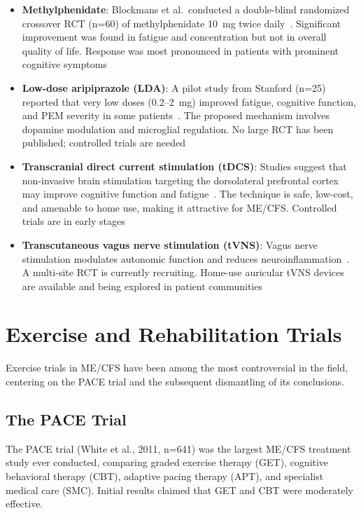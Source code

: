 \begin{itemize}
    \item \textbf{Methylphenidate}: Blockmans et al.\ conducted a double-blind randomized crossover RCT (n=60) of methylphenidate 10~mg twice daily~\cite{Blockmans2006methylphenidate}. Significant improvement was found in fatigue and concentration but not in overall quality of life. Response was most pronounced in patients with prominent cognitive symptoms
    \item \textbf{Low-dose aripiprazole (LDA)}: A pilot study from Stanford (n=25) reported that very low doses (0.2--2~mg) improved fatigue, cognitive function, and PEM severity in some patients~\cite{Crosby2021LDA}. The proposed mechanism involves dopamine modulation and microglial regulation. No large RCT has been published; controlled trials are needed
    \item \textbf{Transcranial direct current stimulation (tDCS)}: Studies suggest that non-invasive brain stimulation targeting the dorsolateral prefrontal cortex may improve cognitive function and fatigue~\cite{Li2022tDCS}. The technique is safe, low-cost, and amenable to home use, making it attractive for ME/CFS. Controlled trials are in early stages
    \item \textbf{Transcutaneous vagus nerve stimulation (tVNS)}: Vagus nerve stimulation modulates autonomic function and reduces neuroinflammation~\cite{NatelsonTVNS2022}. A multi-site RCT is currently recruiting. Home-use auricular tVNS devices are available and being explored in patient communities~\cite{Lugg2024MECFS}
\end{itemize}

\section{Exercise and Rehabilitation Trials}
\label{sec:trials-exercise}

Exercise trials in ME/CFS have been among the most controversial in the field, centering on the PACE trial and the subsequent dismantling of its conclusions.

\subsection{The PACE Trial}

The PACE trial (White et al., 2011, n=641) was the largest ME/CFS treatment study ever conducted, comparing graded exercise therapy (GET), cognitive behavioral therapy (CBT), adaptive pacing therapy (APT), and specialist medical care (SMC). Initial results claimed that GET and CBT were moderately effective.

